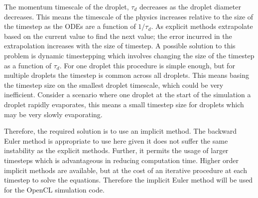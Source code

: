 \documentclass[../Interim_Report_Master]{subfiles}
\begin{document}
The momentum timescale of the droplet, $\tau_d$ decreases as the droplet diameter decreases. This means the timescale of the physics increases relative to the size of the timestep as the ODEs are a function of $1/\tau_d$. As explicit methods extrapolate based on the current value to find the next value; the error incurred in the extrapolation increases with the size of timestep. A possible solution to this problem is dynamic timestepping which involves changing the size of the timestep as a function of $\tau_d$. For one droplet this procedure is simple enough, but for multiple droplets the timestep is common across all droplets. This means basing the timestep size on the smallest droplet timescale, which could be very inefficient. Consider a scenario where one droplet at the start of the simulation a droplet rapidly evaporates, this means a small timestep size for droplets which may be very slowly evaporating. 

Therefore, the required solution is to use an implicit method. The backward Euler method is appropriate to use here given it does not suffer the same instability as the explicit methods. Further, it permits the usage of larger timesteps which is advantageous in reducing computation time. Higher order implicit methods are available, but at the cost of an iterative procedure at each timestep to solve the equations. Therefore the implicit Euler method will be used for the OpenCL simulation code. 
\end{document}
